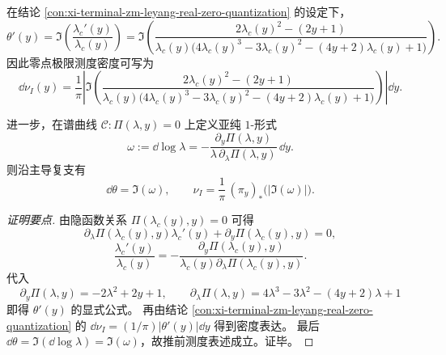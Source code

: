 \begin{conclusion}[零点密度的显式代数微分表达与椭圆谱几何解释]\label{con:xi-terminal-zm-density-elliptic-dlog}
在结论 \ref{con:xi-terminal-zm-leyang-real-zero-quantization} 的设定下，
\[
\theta'(y)
=
\Im\!\left(\frac{\lambda_c'(y)}{\lambda_c(y)}\right)
=
\Im\!\left(
\frac{2\lambda_c(y)^2-(2y+1)}
{\lambda_c(y)\bigl(4\lambda_c(y)^3-3\lambda_c(y)^2-(4y+2)\lambda_c(y)+1\bigr)}
\right).
\]
因此零点极限测度密度可写为
\[
\dd\nu_I(y)
=
\frac{1}{\pi}
\left|
\Im\!\left(
\frac{2\lambda_c(y)^2-(2y+1)}
{\lambda_c(y)\bigl(4\lambda_c(y)^3-3\lambda_c(y)^2-(4y+2)\lambda_c(y)+1\bigr)}
\right)
\right|
\dd y.
\]

进一步，在谱曲线 \(\mathcal C:\Pi(\lambda,y)=0\) 上定义亚纯 \(1\)-形式
\[
\omega:=\dd\log\lambda
=
-\frac{\partial_y\Pi(\lambda,y)}{\lambda\,\partial_\lambda\Pi(\lambda,y)}\,\dd y.
\]
则沿主导复支有
\[
\dd\theta=\Im(\omega),\qquad
\nu_I=\frac{1}{\pi}\,(\pi_y)_*\!\bigl(|\Im(\omega)|\bigr).
\]
\end{conclusion}
\begin{proof}[证明要点]
由隐函数关系 \(\Pi(\lambda_c(y),y)=0\) 可得
\[
\partial_\lambda\Pi(\lambda_c(y),y)\lambda_c'(y)+\partial_y\Pi(\lambda_c(y),y)=0,
\]
\[
\frac{\lambda_c'(y)}{\lambda_c(y)}
=
-\frac{\partial_y\Pi(\lambda_c(y),y)}{\lambda_c(y)\partial_\lambda\Pi(\lambda_c(y),y)}.
\]
代入
\[
\partial_y\Pi(\lambda,y)=-2\lambda^2+2y+1,\qquad
\partial_\lambda\Pi(\lambda,y)=4\lambda^3-3\lambda^2-(4y+2)\lambda+1
\]
即得 \(\theta'(y)\) 的显式公式。
再由结论 \ref{con:xi-terminal-zm-leyang-real-zero-quantization} 的
\(
\dd\nu_I=(1/\pi)|\theta'(y)|\dd y
\)
得到密度表达。
最后 \(\dd\theta=\Im(\dd\log\lambda)=\Im(\omega)\)，故推前测度表述成立。证毕。
\end{proof}

